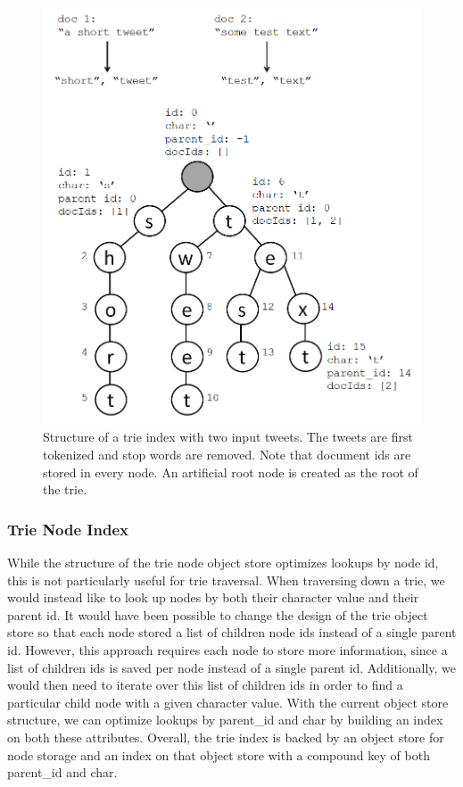 \documentclass{vldb}
\begin{document}
\begin{figure}[h!]
  \centering
   \includegraphics[scale=.35]{trie_figure}
  \caption{Structure of a trie index with two input tweets. The tweets are first tokenized and stop words are removed. Note that document ids are stored in every node. An artificial root node is created as the root of the trie.}
\end{figure}

\subsubsection{Trie Node Index}
While the structure of the trie node object store optimizes lookups by node id, this is not particularly useful for trie traversal. When traversing down a trie, we would instead like to look up nodes by both their character value and their parent id. It would have been possible to change the design of the trie object store so that each node stored a list of children node ids instead of a single parent id. However, this approach requires each node to store more information, since a list of children ids is saved per node instead of a single parent id. Additionally, we would then need to iterate over this list of children ids in order to find a particular child node with a given character value. With the current object store structure, we can optimize lookups by parent\_id and char by building an index on both these attributes. Overall, the trie index is backed by an object store for node storage and an index on that object store with a compound key of both parent\_id and char.
\end{document}
